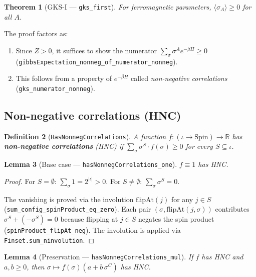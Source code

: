\documentclass[a4paper,11pt]{article}
\newtheorem{theorem}{Theorem}
\newtheorem{lemma}[theorem]{Lemma}
\newtheorem{definition}[theorem]{Definition}
\begin{document}
\begin{theorem}[GKS-I --- \texttt{gks\_first}]
For ferromagnetic parameters, $\langle \sigma_A \rangle \geq 0$
for all $A$.
\end{theorem}

The proof factors as:
\begin{enumerate}
  \item Since $Z > 0$, it suffices to show the numerator
    $\sum_\sigma \sigma^A e^{-\beta H} \geq 0$
    (\texttt{gibbsExpectation\_nonneg\_of\_numerator\_nonneg}).
  \item This follows from a property of $e^{-\beta H}$ called
    \emph{non-negative correlations}
    (\texttt{gks\_numerator\_nonneg}).
\end{enumerate}

\subsection{Non-negative correlations (HNC)}

\begin{definition}[\texttt{HasNonnegCorrelations}]
A function $f : (\iota \to \mathrm{Spin}) \to \mathbb{R}$ has
\textbf{non-negative correlations} (HNC) if
$\sum_\sigma \sigma^S \cdot f(\sigma) \geq 0$ for every
$S \subseteq \iota$.
\end{definition}

\begin{lemma}[Base case --- \texttt{hasNonnegCorrelations\_one}]
$f \equiv 1$ has HNC.
\end{lemma}

\begin{proof}
For $S = \emptyset$: $\sum_\sigma 1 = 2^{|\iota|} > 0$.
For $S \neq \emptyset$: $\sum_\sigma \sigma^S = 0$.

The vanishing is proved via the involution
$\mathrm{flipAt}(j)$ for any $j \in S$
(\texttt{sum\_config\_spinProduct\_eq\_zero}).
Each pair $(\sigma, \mathrm{flipAt}(j, \sigma))$ contributes
$\sigma^S + (-\sigma^S) = 0$ because flipping at $j \in S$ negates
the spin product (\texttt{spinProduct\_flipAt\_neg}).
The involution is applied via \texttt{Finset.sum\_ninvolution}.
\end{proof}

\begin{lemma}[Preservation --- \texttt{hasNonnegCorrelations\_mul}]
\label{lem:mul}
If $f$ has HNC and $a, b \geq 0$, then
$\sigma \mapsto f(\sigma)(a + b\,\sigma^C)$ has HNC.
\end{lemma}
\end{document}
